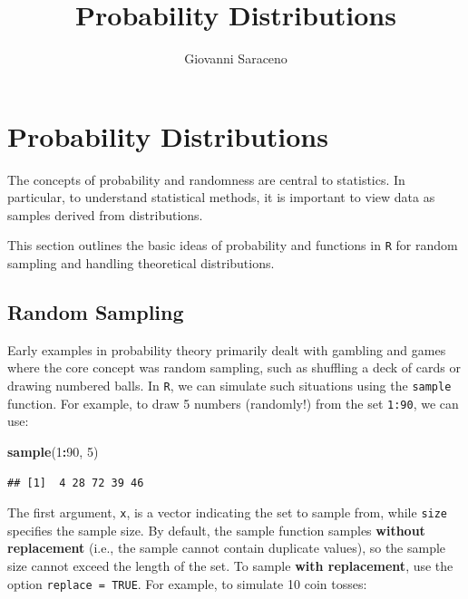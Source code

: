 \documentclass[
]{article}
\title{Probability Distributions}
\author{Giovanni Saraceno}
\date{}
\newenvironment{Shaded}{\begin{snugshade}}{\end{snugshade}}
\newcommand{\DecValTok}[1]{\textcolor[rgb]{0.00,0.00,0.81}{#1}}
\newcommand{\FunctionTok}[1]{\textcolor[rgb]{0.13,0.29,0.53}{\textbf{#1}}}
\newcommand{\NormalTok}[1]{#1}
\newcommand{\SpecialCharTok}[1]{\textcolor[rgb]{0.81,0.36,0.00}{\textbf{#1}}}
\begin{document}
\maketitle

{
\setcounter{tocdepth}{2}
\tableofcontents
}
\hypertarget{probability-distributions}{%
\section{Probability Distributions}\label{probability-distributions}}

The concepts of probability and randomness are central to statistics. In
particular, to understand statistical methods, it is important to view
data as samples derived from distributions.

This section outlines the basic ideas of probability and functions in
\texttt{R} for random sampling and handling theoretical distributions.

\hypertarget{random-sampling}{%
\subsection{Random Sampling}\label{random-sampling}}

Early examples in probability theory primarily dealt with gambling and
games where the core concept was random sampling, such as shuffling a
deck of cards or drawing numbered balls. In \texttt{R}, we can simulate
such situations using the \texttt{sample} function. For example, to draw
5 numbers (randomly!) from the set \texttt{1:90}, we can use:

\begin{Shaded}
\begin{Highlighting}[]
\FunctionTok{sample}\NormalTok{(}\DecValTok{1}\SpecialCharTok{:}\DecValTok{90}\NormalTok{, }\DecValTok{5}\NormalTok{)}
\end{Highlighting}
\end{Shaded}

\begin{verbatim}
## [1]  4 28 72 39 46
\end{verbatim}

The first argument, \texttt{x}, is a vector indicating the set to sample
from, while \texttt{size} specifies the sample size. By default, the
sample function samples \textbf{without replacement} (i.e., the sample
cannot contain duplicate values), so the sample size cannot exceed the
length of the set. To sample \textbf{with replacement}, use the option
\texttt{replace\ =\ TRUE}. For example, to simulate 10 coin tosses:
\end{document}
